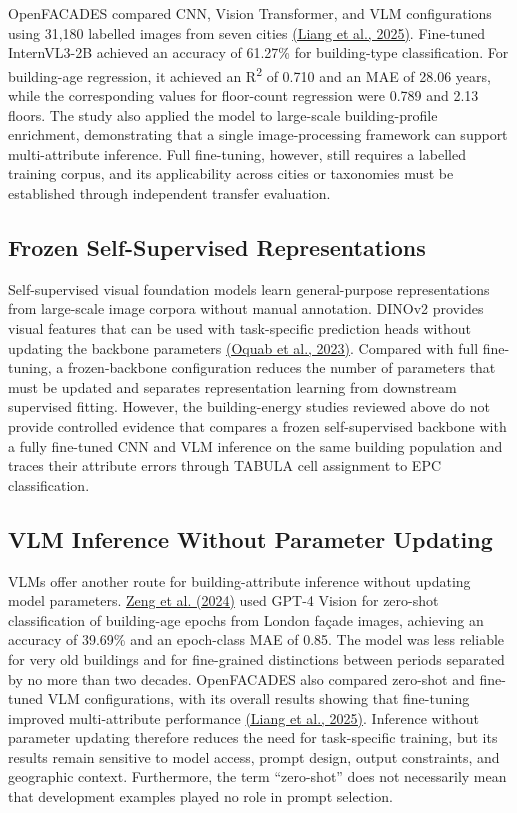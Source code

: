 OpenFACADES compared CNN, Vision Transformer, and VLM configurations using 31,180 labelled images from seven cities \hyperlink{ref:liang2025}{(Liang et al., 2025)}. Fine-tuned InternVL3-2B achieved an accuracy of 61.27\% for building-type classification. For building-age regression, it achieved an R\textsuperscript{2} of 0.710 and an MAE of 28.06 years, while the corresponding values for floor-count regression were 0.789 and 2.13 floors. The study also applied the model to large-scale building-profile enrichment, demonstrating that a single image-processing framework can support multi-attribute inference. Full fine-tuning, however, still requires a labelled training corpus, and its applicability across cities or taxonomies must be established through independent transfer evaluation.


\subsection{Frozen Self-Supervised Representations}
\label{sec:2_5_2}


Self-supervised visual foundation models learn general-purpose representations from large-scale image corpora without manual annotation. DINOv2 provides visual features that can be used with task-specific prediction heads without updating the backbone parameters \hyperlink{ref:oquab2023}{(Oquab et al., 2023)}. Compared with full fine-tuning, a frozen-backbone configuration reduces the number of parameters that must be updated and separates representation learning from downstream supervised fitting. However, the building-energy studies reviewed above do not provide controlled evidence that compares a frozen self-supervised backbone with a fully fine-tuned CNN and VLM inference on the same building population and traces their attribute errors through TABULA cell assignment to EPC classification.


\subsection{VLM Inference Without Parameter Updating}
\label{sec:2_5_3}


VLMs offer another route for building-attribute inference without updating model parameters. \hyperlink{ref:zeng2024}{Zeng et al. (2024)} used GPT-4 Vision for zero-shot classification of building-age epochs from London façade images, achieving an accuracy of 39.69\% and an epoch-class MAE of 0.85. The model was less reliable for very old buildings and for fine-grained distinctions between periods separated by no more than two decades. OpenFACADES also compared zero-shot and fine-tuned VLM configurations, with its overall results showing that fine-tuning improved multi-attribute performance \hyperlink{ref:liang2025}{(Liang et al., 2025)}. Inference without parameter updating therefore reduces the need for task-specific training, but its results remain sensitive to model access, prompt design, output constraints, and geographic context. Furthermore, the term ``zero-shot'' does not necessarily mean that development examples played no role in prompt selection.



